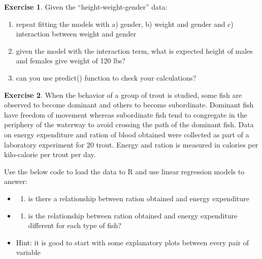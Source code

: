 \documentclass[
]{book}
\providecommand{\tightlist}{%
  \setlength{\itemsep}{0pt}\setlength{\parskip}{0pt}}
\theoremstyle{definition}
\theoremstyle{definition}
\theoremstyle{definition}
\newtheorem{exercise}{Exercise}[chapter]
\theoremstyle{remark}
\begin{document}
\begin{exercise}
\protect\hypertarget{exr:lm-rerun}{}{\label{exr:lm-rerun} }
Given the ``height-weight-gender'' data:

\begin{enumerate}
\def\labelenumi{\alph{enumi})}
\tightlist
\item
  repeat fitting the models with a) gender, b) weight and gender and c) interaction between weight and gender
\item
  given the model with the interaction term, what is expected height of males and females give weight of 120 lbs?
\item
  can you use predict() function to check your calculations?
\end{enumerate}
\end{exercise}

\begin{exercise}
\protect\hypertarget{exr:lm-trout}{}{\label{exr:lm-trout} }
When the behavior of a group of trout is studied, some fish are observed to become dominant and others to become subordinate. Dominant fish have freedom of movement whereas subordinate fish tend to congregate in the periphery of the waterway to avoid crossing the path of the dominant fish. Data on energy expenditure and ration of blood obtained were collected as part of a laboratory experiment for 20 trout. Energy and ration is measured in calories per kilo-calorie per trout per day.

Use the below code to load the data to R and use linear regression models to answer:

\begin{itemize}
\item
  \begin{enumerate}
  \def\labelenumi{\alph{enumi})}
  \tightlist
  \item
    is there a relationship between ration obtained and energy expenditure
  \end{enumerate}
\item
  \begin{enumerate}
  \def\labelenumi{\alph{enumi})}
  \setcounter{enumi}{1}
  \tightlist
  \item
    is the relationship between ration obtained and energy expenditure different for each type of fish?
  \end{enumerate}
\item
  Hint: it is good to start with some explanatory plots between every pair of variable
\end{itemize}
\end{exercise}
\end{document}
